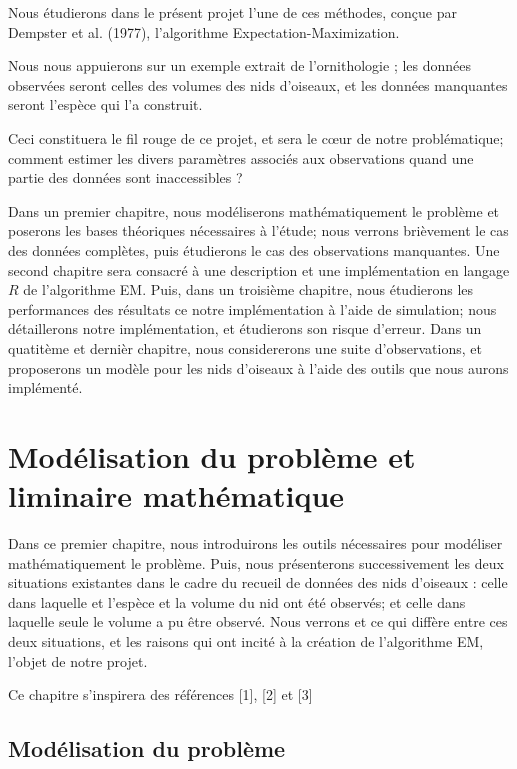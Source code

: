 \documentclass[frenchb]{report}
\newcommand{\1}{\mathbbm{1}}
\theoremstyle{definition}\newtheorem{defn}{Définition}
\theoremstyle{definition}\newtheorem{exm}{Exemple}
\theoremstyle{definition}\newtheorem{nota}{Notation}
\theoremstyle{definition}\newtheorem{rem}{Remarque}
\begin{document}
Nous étudierons dans le présent projet l’une de ces méthodes, conçue par Dempster et al. (1977), l’algorithme Expectation-Maximization.  

Nous nous appuierons sur un exemple extrait de l’ornithologie ; les données observées seront celles des volumes des nids d’oiseaux, et les données manquantes seront l’espèce qui l’a construit.

Ceci constituera le fil rouge de ce projet, et sera le cœur de notre problématique; comment estimer les divers paramètres associés aux observations quand une partie des données sont inaccessibles ?

Dans un premier chapitre, nous modéliserons mathématiquement le problème et poserons les bases théoriques nécessaires à l’étude; nous verrons brièvement le cas des données complètes, puis étudierons le cas des observations manquantes. Une second chapitre sera consacré à une description et une implémentation en langage $R$ de l’algorithme EM. Puis, dans un troisième chapitre, nous étudierons les performances des résultats ce notre implémentation à l'aide de simulation; nous détaillerons notre implémentation, et étudierons son risque d'erreur. Dans un quatitème et dernièr chapitre, nous considererons une suite d'observations, et proposerons un modèle pour les nids d'oiseaux à l'aide des outils que nous aurons implémenté.

\pagebreak


\chapter{Modélisation du problème et liminaire mathématique}
Dans ce premier chapitre, nous introduirons les outils nécessaires pour modéliser mathématiquement le problème. Puis, nous présenterons successivement les deux situations existantes dans le cadre du recueil de données des nids d'oiseaux : celle dans laquelle et l'espèce et la volume du nid ont été observés; et celle dans laquelle seule le volume a pu être observé.
Nous verrons et ce qui diffère entre ces deux situations, et les raisons qui ont incité à la création de l’algorithme EM, l’objet de notre projet. 

Ce chapitre s'inspirera des références [1], [2] et [3]

\section{Modélisation du problème}
\end{document}

